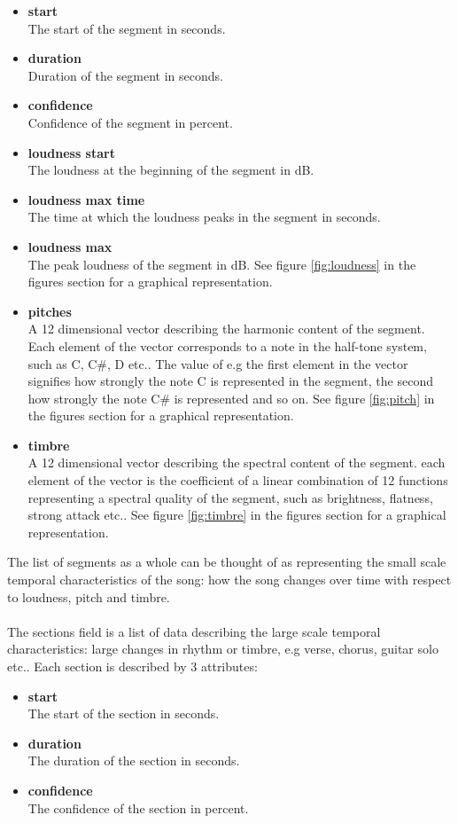 \begin{itemize}
	\item \textbf{start} \\The start of the segment in seconds.
	\item \textbf{duration} \\Duration of the segment in seconds.
	\item \textbf{confidence} \\Confidence of the segment in percent.
	\item \textbf{loudness start} \\The loudness at the beginning of the segment in dB.
	\item \textbf{loudness max time} \\The time at which the loudness peaks in the segment in seconds.
	\item \textbf{loudness max} \\The peak loudness of the segment in dB. See figure \ref{fig:loudness} in the figures section for a graphical representation.
	\item \textbf{pitches} \\A 12 dimensional vector describing the harmonic content of the segment. Each element of the vector corresponds to a note in the half-tone system, such as C, C\#, D etc.. The value of e.g the first element in the vector signifies how strongly the note C is represented in the segment, the second how strongly the note C\# is represented and so on. See figure \ref{fig:pitch} in the figures section for a graphical representation.
	\item \textbf{timbre} \\A 12 dimensional vector describing the spectral content of the segment. each element of the vector is the coefficient of a linear combination of 12 functions representing a spectral quality of the segment, such as brightness, flatness, strong attack etc.. See figure \ref{fig:timbre} in the figures section for a graphical representation.
\end{itemize}
\noindent The list of segments as a whole can be thought of as representing the small scale temporal characteristics of the song: how the song changes over time with respect to loudness, pitch and timbre.
\\\\
The sections field is a list of data describing the large scale temporal characteristics: large changes in rhythm or timbre, e.g verse, chorus, guitar solo etc.. Each section is described by 3 attributes:
\begin{itemize}
	\item \textbf{start} \\The start of the section in seconds.
	\item \textbf{duration} \\The duration of the section in seconds.
	\item \textbf{confidence} \\The confidence of the section in percent.
\end{itemize}

